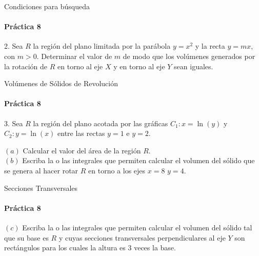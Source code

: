 \documentclass{plantillaPPT}
\begin{document}
\begin{frame}{Condiciones para búsqueda}
    \framesubtitle{Práctica 8}
    
2. Sea \(R\) la región del plano limitada por la parábola \(y=x^2\) y la recta \(y=mx\), con \(m>0\). Determinar el valor de \(m\) de modo que los volúmenes generados por la rotación de \(R\) en torno al eje \(X\) y en torno al eje \(Y\) sean iguales.
    
\end{frame}

\begin{frame}{Volúmenes de Sólidos de Revolución}
    \framesubtitle{Práctica 8}

3. Sea \(R\) la región del plano acotada por las gráficas \(C_1:x=\ln(y)\) y \(C_2:y=\ln(x)\) entre las rectas \(y=1\) e \(y=2\). \\ \vspace{0.3cm}

\((a)\) Calcular el valor del área de la región \(R\). \\ \vspace{0.3cm}
\((b)\) Escriba la o las integrales que permiten calcular el volumen del sólido que se genera al hacer rotar \(R\) en torno a los ejes \(x=8\) \(y=4\). \\ \vspace{0.3cm}

\end{frame}

\begin{frame}{Secciones Transversales}
    \framesubtitle{Práctica 8}

\((c)\) Escriba la o las integrales que permiten calcular el volumen del sólido tal que su base es \(R\) y cuyas secciones transversales perpendiculares al eje \(Y\) son rectángulos para los cuales la altura es 3 veces la base.

\end{frame}
\end{document}
